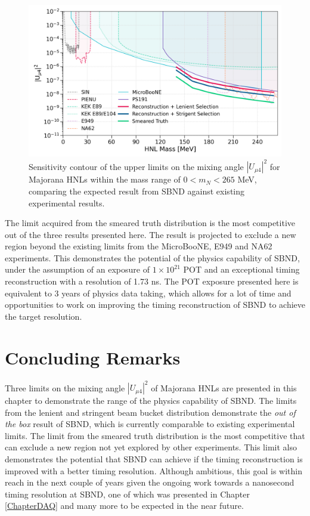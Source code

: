 \begin{figure}[bp!]
    \centering
    \includegraphics[width=\textwidth]{sensitivity}
    \caption{Sensitivity contour of the upper limits on the mixing angle $|U_{\mu4}|^2$ for Majorana HNLs within the mass range of $0 < m_N < 265$ MeV, comparing the expected result from SBND against existing experimental results.}
    \label{fig:sensitivity}
\end{figure}

The limit acquired from the smeared truth distribution is the most competitive out of the three results presented here.
The result is projected to exclude a new region beyond the existing limits from the MicroBooNE, E949 and NA62 experiments.
This demonstrates the potential of the physics capability of SBND, under the assumption of an exposure of $1 \times 10^{21}$ POT and an exceptional timing reconstruction with a resolution of 1.73 ns.
The POT exposure presented here is equivalent to 3 years of physics data taking, which allows for a lot of time and opportunities to work on improving the timing reconstruction of SBND to achieve the target resolution.


\section{Concluding Remarks}
\label{sec:result_remarks}

Three limits on the mixing angle $|U_{\mu4}|^2$ of Majorana HNLs are presented in this chapter to demonstrate the range of the physics capability of SBND.
The limits from the lenient and stringent beam bucket distribution demonstrate the \textit{out of the box} result of SBND, which is currently comparable to existing experimental limits.
The limit from the smeared truth distribution is the most competitive that can exclude a new region not yet explored by other experiments.
This limit also demonstrates the potential that SBND can achieve if the timing reconstruction is improved with a better timing resolution.
Although ambitious, this goal is within reach in the next couple of years given the ongoing work towards a nanosecond timing resolution at SBND, one of which was presented in Chapter \ref{ChapterDAQ} and many more to be expected in the near future.
 


